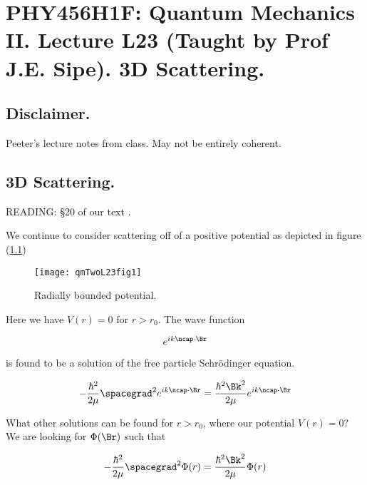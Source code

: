 
%

\chapter{PHY456H1F: Quantum Mechanics II.  Lecture L23 (Taught by Prof J.E. Sipe).  3D Scattering.}
\label{chap:qmTwoL23}
{}
\date{Nov 30, 2011}

\beginArtWithToc

\section{Disclaimer.}

Peeter's lecture notes from class.  May not be entirely coherent.

\section{3D Scattering.}

READING: \S 20 of our text \cite{desai2009quantum}.

We continue to consider scattering off of a positive potential as depicted in figure (\ref{fig:qmTwoL23:qmTwoL23fig1})
\begin{figure}[htp]
   \centering
   \texttt{[image: qmTwoL23fig1]}
   \caption{Radially bounded potential.}\label{fig:qmTwoL23:qmTwoL23fig1}
\end{figure}

Here we have $V(r) = 0$ for $r > r_0$.  The wave function

\begin{equation}\label{eqn:qmTwoL23:n}
e^{i k \ncap \cdot \Br}
\end{equation}

is found to be a solution of the free particle Schr\"{o}dinger equation.

\begin{equation}\label{eqn:qmTwoL23:n}
- \frac{\hbar^2}{2\mu} \spacegrad^2 
e^{i k \ncap \cdot \Br}
 = \frac{\hbar^2 \Bk^2}{2 \mu} 
e^{i k \ncap \cdot \Br}
\end{equation}

What other solutions can be found for $r > r_0$, where our potential $V(r) = 0$?  We are looking for $\Phi(\Br)$ such that

\begin{equation}\label{eqn:qmTwoL23:n}
- \frac{\hbar^2}{2\mu} \spacegrad^2 
\Phi(r)
 = \frac{\hbar^2 \Bk^2}{2 \mu} 
\Phi(r)
\end{equation}

